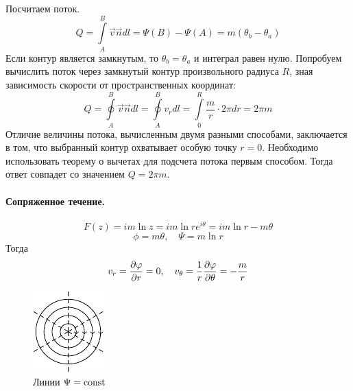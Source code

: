 Посчитаем поток. 
\begin{equation}
	Q=\int\limits_{A}^{B} \vec{v}\vec{n}dl=\Psi(B)-\Psi(A)=m(\theta_b-\theta_a)
\end{equation}
Если контур является замкнутым, то $\theta_b=\theta_a$ и интеграл равен нулю.
Попробуем вычислить поток через замкнутый контур произвольного радиуса $R$, зная зависимость скорости от пространственных координат: 
\begin{equation}
	Q=\oint\limits_{A}^{B} \vec{v}\vec{ n } dl=\oint\limits_{A}^{B} v_r dl=\int\limits_{0}^{R} \frac{m}{r} \cdot 2\pi dr =2\pi m%
\end{equation}
Отличие величины потока, вычисленным двумя разными способами, заключается в том, что выбранный контур охватывает особую точку $r=0$. Необходимо использовать теорему о вычетах для подсчета потока первым способом. Тогда ответ совпадет со значением $Q=2\pi m$.

\paragraph{Сопряженное течение.}
\begin{equation}
	F(z)=im\ln{z}=im\ln{re^{i \theta}}=im\ln{r}-m\theta
\end{equation}
\begin{equation}
	\phi=m\theta, \quad
	\Psi=m\ln{r}
\end{equation}
Тогда
\begin{equation}
	v_r=\pdv{\varphi}{r}=0, \quad
	v_\theta=\frac{1}{r}\pdv{\varphi}{\theta}=-\frac{m}{r}
\end{equation}

\begin{figure}[h!]
    \centering
    \includegraphics[scale=1.5]{img/sopr}
    \caption{Линии $\Psi=\mathrm{const}\,$}
    \label{fig:figure1}
\end{figure}

